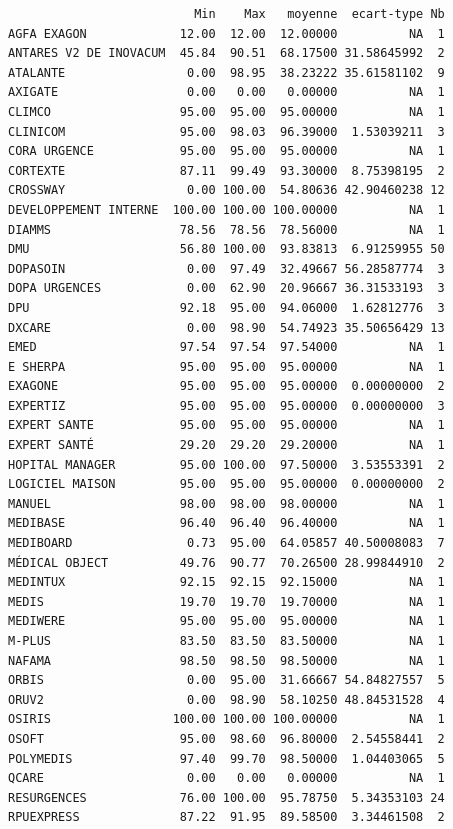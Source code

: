 \documentclass[]{article}
\begin{document}
\begin{verbatim}
                          Min    Max   moyenne  ecart-type Nb
AGFA EXAGON             12.00  12.00  12.00000          NA  1
ANTARES V2 DE INOVACUM  45.84  90.51  68.17500 31.58645992  2
ATALANTE                 0.00  98.95  38.23222 35.61581102  9
AXIGATE                  0.00   0.00   0.00000          NA  1
CLIMCO                  95.00  95.00  95.00000          NA  1
CLINICOM                95.00  98.03  96.39000  1.53039211  3
CORA URGENCE            95.00  95.00  95.00000          NA  1
CORTEXTE                87.11  99.49  93.30000  8.75398195  2
CROSSWAY                 0.00 100.00  54.80636 42.90460238 12
DEVELOPPEMENT INTERNE  100.00 100.00 100.00000          NA  1
DIAMMS                  78.56  78.56  78.56000          NA  1
DMU                     56.80 100.00  93.83813  6.91259955 50
DOPASOIN                 0.00  97.49  32.49667 56.28587774  3
DOPA URGENCES            0.00  62.90  20.96667 36.31533193  3
DPU                     92.18  95.00  94.06000  1.62812776  3
DXCARE                   0.00  98.90  54.74923 35.50656429 13
EMED                    97.54  97.54  97.54000          NA  1
E SHERPA                95.00  95.00  95.00000          NA  1
EXAGONE                 95.00  95.00  95.00000  0.00000000  2
EXPERTIZ                95.00  95.00  95.00000  0.00000000  3
EXPERT SANTE            95.00  95.00  95.00000          NA  1
EXPERT SANTÉ            29.20  29.20  29.20000          NA  1
HOPITAL MANAGER         95.00 100.00  97.50000  3.53553391  2
LOGICIEL MAISON         95.00  95.00  95.00000  0.00000000  2
MANUEL                  98.00  98.00  98.00000          NA  1
MEDIBASE                96.40  96.40  96.40000          NA  1
MEDIBOARD                0.73  95.00  64.05857 40.50008083  7
MÉDICAL OBJECT          49.76  90.77  70.26500 28.99844910  2
MEDINTUX                92.15  92.15  92.15000          NA  1
MEDIS                   19.70  19.70  19.70000          NA  1
MEDIWERE                95.00  95.00  95.00000          NA  1
M-PLUS                  83.50  83.50  83.50000          NA  1
NAFAMA                  98.50  98.50  98.50000          NA  1
ORBIS                    0.00  95.00  31.66667 54.84827557  5
ORUV2                    0.00  98.90  58.10250 48.84531528  4
OSIRIS                 100.00 100.00 100.00000          NA  1
OSOFT                   95.00  98.60  96.80000  2.54558441  2
POLYMEDIS               97.40  99.70  98.50000  1.04403065  5
QCARE                    0.00   0.00   0.00000          NA  1
RESURGENCES             76.00 100.00  95.78750  5.34353103 24
RPUEXPRESS              87.22  91.95  89.58500  3.34461508  2

\end{verbatim}
\end{document}
